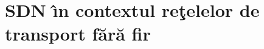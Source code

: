 \chapter{SDN \^{\i}n contextul reţelelor de transport fără fir\label{ch:sdn_in_contextul_wt}}

\graphicspath{ {cap-sdn_in_contextul_wt/figures/} }








